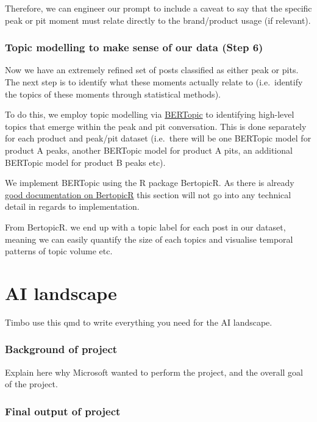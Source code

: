 \documentclass[
  letterpaper,
  DIV=11,
  numbers=noendperiod]{scrreprt}
\begin{document}
Therefore, we can engineer our prompt to include a caveat to say that
the specific peak or pit moment must relate directly to the
brand/product usage (if relevant).

\subsection{Topic modelling to make sense of our data (Step
6)}\label{step-six}

Now we have an extremely refined set of posts classified as either peak
or pits. The next step is to identify what these moments actually relate
to (i.e.~identify the topics of these moments through statistical
methods).

To do this, we employ topic modelling via
\href{https://maartengr.github.io/BERTopic/index.html}{BERTopic} to
identifying high-level topics that emerge within the peak and pit
conversation. This is done separately for each product and peak/pit
dataset (i.e.~there will be one BERTopic model for product A peaks,
another BERTopic model for product A pits, an additional BERTopic model
for product B peaks etc).

We implement BERTopic using the R package BertopicR. As there is already
\href{https://aoiferyan-sc.github.io/BertopicR/}{good documentation on
BertopicR} this section will not go into any technical detail in regards
to implementation.

From BertopicR. we end up with a topic label for each post in our
dataset, meaning we can easily quantify the size of each topics and
visualise temporal patterns of topic volume etc.


\chapter{AI landscape}\label{ai-landscape}

Timbo use this qmd to write everything you need for the AI landscape.

\subsection{Background of project}\label{background-of-project}

Explain here why Microsoft wanted to perform the project, and the
overall goal of the project.

\subsection{Final output of project}\label{final-output-of-project}
\end{document}
